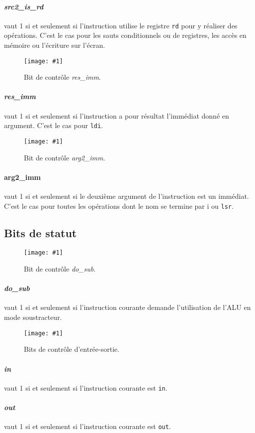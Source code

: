 \documentclass[twoside, 12pt, a4paper]{article}
\newcommand{\cf}[3]{
    \begin{figure}[!h]
        \centering
        \texttt{[image: \#1]}
    \caption{#3}\label{Fig:#1}
    \end{figure}
}
\newcommand{\hcf}[2]{\cf{#1}{.75}{#2}}
\begin{document}
\paragraph{\textit{src2\_is\_rd}} vaut 1 si et seulement si l'instruction utilise le registre \texttt{rd} pour y réaliser des opérations.
C'est le cas pour les sauts conditionnels ou de registres, les accès en mémoire ou l'écriture sur l'écran.

\hcf{res_imm.png}{Bit de contrôle \textit{res\_imm}.}

\paragraph{\textit{res\_imm}} vaut 1 si et seulement si l'instruction a pour résultat l'immédiat donné en argument.
C'est le cas pour \texttt{ldi}.

\hcf{arg2_imm.png}{Bit de contrôle \textit{arg2\_imm}.}

\paragraph{arg2\_imm} vaut 1 si et seulement si le deuxième argument de l'instruction est un immédiat.
C'est le cas pour toutes les opérations dont le nom se termine par i ou \texttt{lsr}.

\clearpage

\subsection{Bits de statut}

\hcf{do_sub.png}{Bit de contrôle \textit{do\_sub}.}

\paragraph{\textit{do\_sub}} vaut 1 si et seulement si l'instruction courante demande l'utilisation de l'ALU en mode soustracteur.

\hcf{in_out.png}{Bits de contrôle d'entrée-sortie.}

\paragraph{\textit{in}} vaut 1 si et seulement si l'instruction courante est \texttt{in}.

\paragraph{\textit{out}} vaut 1 si et seulement si l'instruction courante est \texttt{out}.
\end{document}
